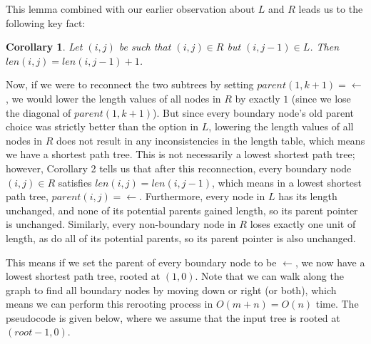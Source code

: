 \documentclass{article}
\newtheorem{corollary}{Corollary}
\begin{document}
This lemma combined with our earlier observation about $L$ and $R$ leads us to the following key fact:
\begin{corollary}
Let $(i,j)$ be such that $(i,j) \in R$ but $(i,j-1) \in L$.  Then $len(i,j) = len(i,j-1) + 1$.
\end{corollary}

Now, if we were to reconnect the two subtrees by setting $parent(1,k+1) = \leftarrow$, we would lower the length values of all nodes in $R$ by exactly $1$ (since we lose the diagonal of $parent(1,k+1)$).  But since every boundary node's old parent choice was strictly better than the option in $L$, lowering the length values of all nodes in $R$ does not result in any inconsistencies in the length table, which means we have a shortest path tree.  This is not necessarily a lowest shortest path tree; however, Corollary 2 tells us that after this reconnection, every boundary node $(i,j) \in R$ satisfies $len(i,j) = len(i,j-1)$, which means in a lowest shortest path tree, $parent(i,j) = \leftarrow$.  Furthermore, every node in $L$ has its length unchanged, and none of its potential parents gained length, so its parent pointer is unchanged.  Similarly, every non-boundary node in $R$ loses exactly one unit of length, as do all of its potential parents, so its parent pointer is also unchanged.

This means if we set the parent of every boundary node to be $\leftarrow$, we now have a lowest shortest path tree, rooted at $(1,0)$.  Note that we can walk along the graph to find all boundary nodes by moving down or right (or both), which means we can perform this rerooting process in $O(m + n) = O(n)$ time.  The pseudocode is given below, where we assume that the input tree is rooted at $(root-1, 0)$.
\end{document}
